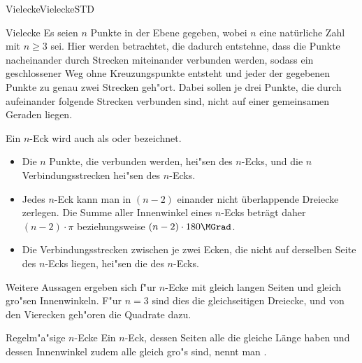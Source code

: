 \begin{MXContent}{Vielecke}{Vielecke}{STD}

\begin{MXInfo}{Vielecke}%
Es seien $n$ Punkte in der Ebene gegeben, wobei $n$ eine nat\"urliche Zahl mit 
$n \geq 3$ sei.
Hier werden  betrachtet, die dadurch entstehne, dass
die Punkte nacheinander durch Strecken miteinander verbunden werden, sodass 
ein geschlossener Weg ohne Kreuzungspunkte entsteht und jeder der gegebenen 
Punkte zu genau zwei Strecken geh"ort. 
Dabei sollen je drei Punkte, die durch aufeinander folgende Strecken verbunden
sind, nicht auf einer gemeinsamen Geraden liegen.

Ein $n$-Eck wird auch als  oder 
 bezeichnet.
       
\begin{itemize}
 \item Die $n$ Punkte, die verbunden werden, hei"sen 
   des $n$-Ecks, und
  die $n$ Verbindungsstrecken hei"sen
   des $n$-Ecks.

\item Jedes $n$-Eck kann man in $(n-2)$ einander nicht \"uberlappende 
Dreiecke zerlegen. Die Summe aller Innenwinkel eines $n$-Ecks betr\"agt daher 
$(n-2) \cdot \pi$ beziehungsweise $(n-2) \cdot 180\MGrad$.

\item Die Verbindungsstrecken zwischen je zwei Ecken, die nicht auf derselben 
Seite des $n$-Ecks liegen, hei"sen die  
des $n$-Ecks.
\end{itemize}
\end{MXInfo}

Weitere Aussagen ergeben sich f"ur $n$-Ecke mit gleich langen Seiten und 
gleich gro"sen Innenwinkeln. F"ur $n = 3$ sind dies die gleichseitigen 
Dreiecke, und von den Vierecken geh"oren die Quadrate dazu.

\begin{MXInfo}{Regelm"a"sige $n$-Ecke}
 Ein $n$-Eck, dessen Seiten alle die gleiche L\"ange haben und dessen 
Innenwinkel zudem alle gleich gro"s sind, nennt man
.
\end{MXInfo}

\end{MXContent}


